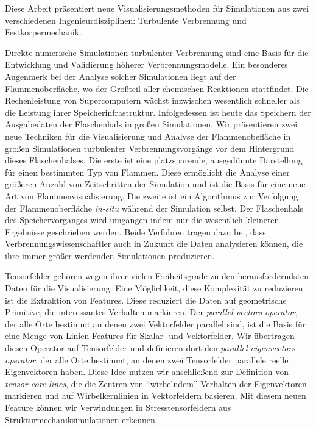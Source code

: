 \documentclass[oneside]{scrartcl}
\author{Timo Oster}
\date{26. April 2019}
\begin{document}
%
Diese Arbeit pr\"asentiert neue Visualisierungsmethoden f\"ur Simulationen aus
zwei verschiedenen Ingenieurdisziplinen: Turbulente Verbrennung und
Festk\"orpermechanik.
%

%
Direkte numerische Simulationen turbulenter Verbrennung sind eine Basis f\"ur
die Entwicklung und Validierung h\"oherer Verbrennungsmodelle.
%
Ein besonderes Augenmerk bei der Analyse solcher Simulationen liegt auf der
Flammenoberfl\"ache, wo der Gro\ss{}teil aller chemischen Reaktionen
stattfindet.
%
Die Rechenleistung von Supercomputern w\"achst inzwischen wesentlich schneller
als die Leistung ihrer Speicherinfrastruktur.
%
Infolgedessen ist heute das Speichern der Ausgabedaten der Flaschenhals in
gro\ss{}en Simulationen.
%
Wir pr\"asentieren zwei neue Techniken f\"ur die Visualisierung und Analyse der
Flammenobefl\"ache in gro\ss{}en Simulationen turbulenter Verbrennungsvorg\"ange
vor dem Hintergrund dieses Flaschenhalses.
%
Die erste ist eine platzsparende, ausged\"unnte Darstellung f\"ur einen
bestimmten Typ von Flammen.
%
Diese erm\"oglicht die Analyse einer gr\"o\ss{}eren Anzahl von Zeitschritten der
Simulation und ist die Basis f\"ur eine neue Art von Flammenvisualisierung.
%
Die zweite ist ein Algorithmus zur Verfolgung der Flammenoberfl\"ache
\emph{in-situ} w\"ahrend der Simulation selbst.
%
Der Flaschenhals des Speichervorganges wird umgangen indem nur die wesentlich
kleineren Ergebnisse geschrieben werden.
%
Beide Verfahren tragen dazu bei, dass Verbrennungswissenschaftler auch in
Zukunft die Daten analysieren k\"onnen, die ihre immer gr\"o\ss{}er werdenden
Simulationen produzieren.
%

%
Tensorfelder geh\"oren wegen ihrer vielen Freiheitsgrade zu den
herausforderndsten Daten f\"ur die Visualisierung.
%
Eine M\"oglichkeit, diese Komplexit\"at zu reduzieren ist die Extraktion von
Features.
%
Diese reduziert die Daten auf geometrische Primitive, die interessantes
Verhalten markieren.
%
Der \emph{parallel vectors operator}, der alle Orte bestimmt an denen zwei
Vektorfelder parallel sind, ist die Basis f\"ur eine Menge von Linien-Features
f\"ur Skalar- und Vektorfelder.
%
Wir übertragen diesen Operator auf Tensorfelder und definieren dort den
\emph{parallel eigenvectors operator}, der alle Orte bestimmt, an denen zwei
Tensorfelder parallele reelle Eigenvektoren haben.
%
Diese Idee nutzen wir anschlie\ss{}end zur Definition von \emph{tensor core
lines}, die die Zentren von ``wirbelndem'' Verhalten der Eigenvektoren markieren
und auf Wirbelkernlinien in Vektorfeldern basieren.
%
Mit diesem neuen Feature k\"onnen wir Verwindungen in Stresstensorfeldern aus
Strukturmechaniksimulationen erkennen.
\end{document}
